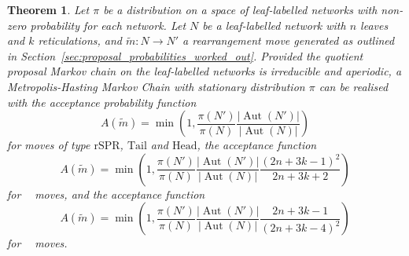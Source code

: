 \documentclass{article}
\newtheorem{theorem}{Theorem}
\theoremstyle{definition}
\DeclareMathOperator{\Aut}{Aut}
\DeclareMathOperator{\VM}{Vert^{--}}
\DeclareMathOperator{\VP}{Vert^+}
\newcommand{\Tail}{\mathrm{Tail}}
\newcommand{\Head}{\mathrm{Head}}
\newcommand{\rSPR}{\mathrm{rSPR}}
\begin{document}
\begin{theorem}\label{the:MH_for_leaf_labelled_networks}
    Let $\pi$ be a distribution on a space of leaf-labelled networks with non-zero probability for each network. Let $N$ be a leaf-labelled network with $n$ leaves and $k$ reticulations, and $\widetilde{m}:N \to N'$ a rearrangement move generated as outlined in Section~\ref{sec:proposal_probabilities_worked_out}. Provided the quotient proposal Markov chain on the leaf-labelled networks is irreducible and aperiodic, a Metropolis-Hasting Markov Chain with stationary distribution $\pi$ can be realised with the acceptance probability function
    \[
        A(\widetilde{m}) = \min\left(1, \frac{\pi(N')}{\pi(N)}\frac{|\Aut(N')|}{|\Aut(N)|}\right)
    \]
    for moves of type $\rSPR$, $\Tail$ and $\Head$, the acceptance function
    \[
        A(\widetilde{m}) = \min\left(1, \frac{\pi(N')}{\pi(N)}\frac{|\Aut(N')|}{|\Aut(N)|} \frac{(2n + 3k - 1)^2}{2n + 3k + 2} \right)
    \]
    for $\VP$ moves, and the acceptance function 
    \[
        A(\widetilde{m}) = \min\left(1, \frac{\pi(N')}{\pi(N)}\frac{|\Aut(N')|}{|\Aut(N)|} \frac{2n + 3k -1}{(2n + 3k - 4)^2}\right)
    \]
    for $\VM$ moves.
\end{theorem}
\end{document}
